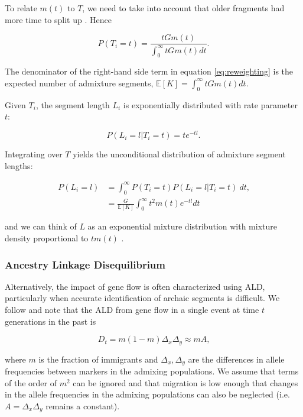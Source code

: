 \documentclass[11pt]{article}
\begin{document}
To relate $m(t)$ to $T$, we need to take into account that older fragments had more time to split up \citep[see e.g.][]{pool_inference_2009}. Hence

\begin{equation}
	P(T_i=t) = \frac{t  G m(t)}{\int_0^{\infty} t  G  m(t) dt}\label{eq:reweighting} \text{.}
\end{equation}

The denominator of the right-hand side term in equation \ref{eq:reweighting} is the expected number of admixture segments, $\mathbb{E}[K] = \int_0^{\infty} t  G  m(t) dt$.

Given $T_i$, the segment length $L_i$ is exponentially distributed with rate parameter $t$:

\begin{equation}
 \label{eq:generall_length_distribution}
    P(L_i=l|T_i=t) = t e^{-t l}  \text{.}
\end{equation}
	
Integrating over $T$ yields the unconditional distribution of admixture segment lengths:
	
\begin{align}
P(L_i=l) &= \int_{0}^{\infty} P(T_i=t) P(L_i=l | T_i=t) \ dt \text{,}\nonumber\\
&=\frac{G}{ \mathbb{E}[K]}\int_{0}^{\infty} t^2 m(t) e^{-tl}dt
    \label{eq:standard_likelihood_definintion}
\end{align}
	
	
and we can think of $L$ as an exponential mixture distribution with mixture density proportional to $tm(t)$ \citep{ralph_geography_2013, ni_length_2016, zhou_modeling_2017}.
	
\subsubsection{Ancestry Linkage Disequilibrium}
Alternatively, the impact of gene flow is often characterized using ALD, particularly when accurate identification of archaic segments is difficult. We follow \cite{loh_inferring_2013} and note that the ALD from gene flow in a single event at time $t$ generations in the past is

\begin{equation}
    D_{t} = m(1-m)\Delta_x \Delta_y \approx m A \text{,} \label{eq:ald_general}
\end{equation}

where $m$ is the fraction of immigrants and $\Delta_x, \Delta_y$ are the differences in allele frequencies between markers in the admixing populations. We assume that terms of the order of $m^2$ can be ignored and that migration is low enough that changes in the allele frequencies in the admixing populations can also be neglected (i.e. $A=\Delta_x\Delta_y$ remains a constant). 
\end{document}
